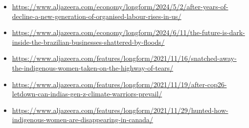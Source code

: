 \begin{itemize}
    \item \url{https://www.aljazeera.com/economy/longform/2024/5/2/after-years-of-decline-a-new-generation-of-organised-labour-rises-in-us/}
    \item \url{https://www.aljazeera.com/economy/longform/2024/6/11/the-future-is-dark-inside-the-brazilian-businesses-shattered-by-floods/}
    \item \url{https://www.aljazeera.com/features/longform/2021/11/16/snatched-away-the-indigenous-women-taken-on-the-highway-of-tears/}
    \item \url{https://www.aljazeera.com/features/longform/2021/11/19/after-cop26-letdown-can-indias-gen-z-climate-warriors-prevail/}
    \item \url{https://www.aljazeera.com/features/longform/2021/11/29/hunted-how-indigenous-women-are-disappearing-in-canada/}
\end{itemize}
